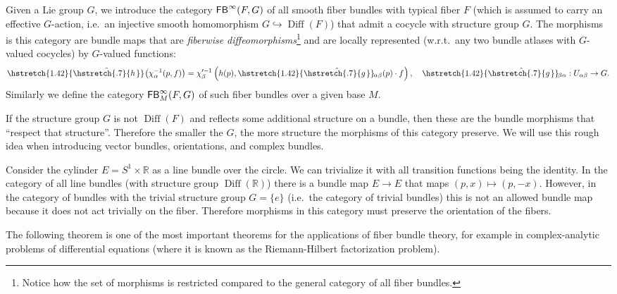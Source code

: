 \documentclass[english,letterpaper]{article}%
\numberwithin{equation}{section}
\numberwithin{figure}{section}
\numberwithin{table}{section}
\theoremstyle{definition}
\theoremstyle{definition}
\theoremstyle{definition}
\theoremstyle{plain}
\theoremstyle{plain}
\theoremstyle{plain}
\theoremstyle{plain}
\theoremstyle{remark}
\theoremstyle{remark}
\DeclareMathOperator{\Diff}{Diff}
\newcommand\wh[1]{\hstretch{1.42}{\hat{\hstretch{.7}{#1\mkern2mu}}}\mkern-2mu} %
\newcommand\wt[1]{\hstretch{1.42}{\tilde{\hstretch{.7}{#1\mkern2mu}}}\mkern-2mu}
\begin{document}
\begin{defn}
    Given a Lie group $G$, we introduce the category ${\sf FB}^\infty(F,G)$ of all smooth fiber bundles with typical fiber $F$ (which is assumed to carry an effective $G$-action, i.e.\ an injective smooth homomorphism $G\hookrightarrow\Diff(F)$) that admit a cocycle with structure group $G$. The morphisms is this category are bundle maps that are \emph{fiberwise diffeomorphisms}\footnote{Notice how the set of morphisms is restricted compared to the general category of all fiber bundles.} and are locally represented (w.r.t.\ any two bundle atlases with $G$-valued cocycles) by $G$-valued functions: \[\wt{h}\left(\chi_\alpha^{-1}(p,f)\right)=\chi_\beta^{\prime-1}\left(h(p),\wh{g}_{\alpha\beta}(p)\cdot f\right),\quad \wh{g}_{\beta\alpha}:U_{\alpha\beta}\to G.\]
    Similarly we define the category ${\sf FB}^{\infty}_M(F,G)$ of such fiber bundles over a given base $M$.
\end{defn}

\begin{rem}
    If the structure group $G$ is not $\Diff(F)$ and reflects some additional structure on a bundle, then these are the bundle morphisms that ``respect that structure''. Therefore the smaller the $G$, the more structure the morphisms of this category preserve. We will use this rough idea when introducing vector bundles, orientations, and complex bundles.
\end{rem}

\begin{example}
    Consider the cylinder $E=S^1\times\mathbb{R}$ as a line bundle over the circle. We can trivialize it with all transition functions being the identity. In the category of all line bundles (with structure group $\Diff(\mathbb{R})$) there is a bundle map $E\to E$ that maps $(p,x)\mapsto (p,-x)$. However, in the category of bundles with the trivial structure group $G=\{e\}$ (i.e.\ the category of trivial bundles) this is not an allowed bundle map because it does not act trivially on the fiber. Therefore morphisms in this category must preserve the orientation of the fibers.
\end{example}

The following theorem is one of the most important theorems for the applications of fiber bundle theory, for example in complex-analytic problems of differential equations (where it is known as the Riemann-Hilbert factorization problem).
\end{document}
